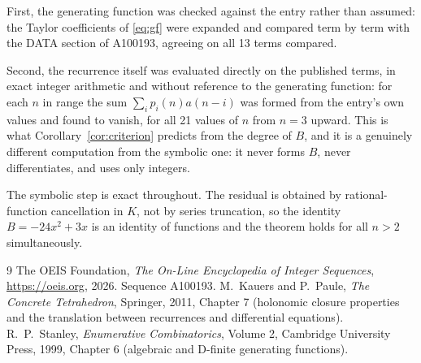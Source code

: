 \documentclass[11pt,a4paper]{article}
\theoremstyle{plain}
\theoremstyle{definition}
\begin{document}
First, the generating function was checked against the entry rather than assumed: the
Taylor coefficients of \eqref{eq:gf} were expanded and compared term by term with the DATA
section of A100193, agreeing on all 13 terms compared.

Second, the recurrence itself was evaluated directly on the published terms, in exact
integer arithmetic and without reference to the generating function: for each $n$ in range
the sum $\sum_{i}p_{i}(n)a(n-i)$ was formed from the entry's own values and found to
vanish, for all 21 values of $n$ from $n=3$ upward. This is what
Corollary~\ref{cor:criterion} predicts from the degree of $B$, and it is a genuinely
different computation from the symbolic one: it never forms $B$, never differentiates, and
uses only integers.

The symbolic step is exact throughout. The residual is obtained by rational-function
cancellation in $K$, not by series truncation, so the identity $B=- 24 x^{2} + 3 x$ is an
identity of functions and the theorem holds for all $n>2$ simultaneously.

\begin{thebibliography}{9}
 The OEIS Foundation, \emph{The On-Line Encyclopedia of Integer Sequences},
\url{https://oeis.org}, 2026. Sequence A100193.
 M.~Kauers and P.~Paule, \emph{The Concrete Tetrahedron}, Springer, 2011,
Chapter 7 (holonomic closure properties and the translation between recurrences and
differential equations).
 R.~P.~Stanley, \emph{Enumerative Combinatorics}, Volume 2, Cambridge
University Press, 1999, Chapter 6 (algebraic and D-finite generating functions).
\end{thebibliography}
\end{document}
